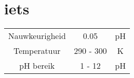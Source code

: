 \section{iets}

\begin{table}[ht]
    \begin{tabular}{|c|c|c|}
        Nauwkeurigheid & 0.05 & pH \\ 
        Temperatuur    & 290 - 300 & K \\
        pH bereik      & 1 - 12 & pH
    \end{tabular}
\end{table}